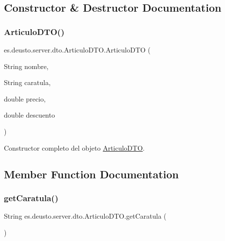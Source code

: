\subsection{Constructor \& Destructor Documentation}
\mbox{\label{classes_1_1deusto_1_1server_1_1dto_1_1_articulo_d_t_o_a89818e8393a667a135cb35317aa7e906}} 
\subsubsection{\texorpdfstring{ArticuloDTO()}{ArticuloDTO()}}
{\footnotesize\ttfamily es.\+deusto.\+server.\+dto.\+Articulo\+D\+T\+O.\+Articulo\+D\+TO (\begin{DoxyParamCaption}\item[{String}]{nombre,  }\item[{String}]{caratula,  }\item[{double}]{precio,  }\item[{double}]{descuento }\end{DoxyParamCaption})}

Constructor completo del objeto \mbox{\hyperlink{classes_1_1deusto_1_1server_1_1dto_1_1_articulo_d_t_o}{Articulo\+D\+TO}}. 

\subsection{Member Function Documentation}
\mbox{\label{classes_1_1deusto_1_1server_1_1dto_1_1_articulo_d_t_o_a62812218cc960b644b7b5f3beba0a015}} 
\subsubsection{\texorpdfstring{getCaratula()}{getCaratula()}}
{\footnotesize\ttfamily String es.\+deusto.\+server.\+dto.\+Articulo\+D\+T\+O.\+get\+Caratula (\begin{DoxyParamCaption}{ }\end{DoxyParamCaption})}


